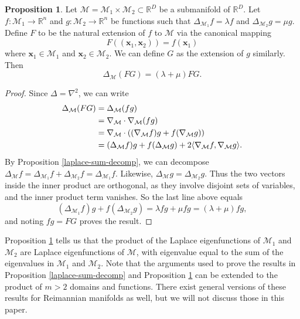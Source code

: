 \documentclass{article}
\numberwithin{equation}{section}
\theoremstyle{definition}
\newtheorem{prop}[thm]{Proposition}
\begin{document}
\begin{prop}\label{laplace-pof}
Let $\mathcal{M} = \mathcal{M}_1 \times \mathcal{M}_2 \subset \mathbb{R}^D$ be a submanifold of $\mathbb{R}^D$. Let $f : \mathcal{M}_1 \rightarrow \mathbb{R}^n$ and $g : \mathcal{M}_2 \rightarrow \mathbb{R}^n$ be functions such that $\Delta_{\mathcal{M}_1}f = \lambda f$ and $\Delta_{\mathcal{M}_2}g = \mu g$. Define $F$ to be the natural extension of $f$ to $\mathcal{M}$ via the canonical mapping
\[
F((\mathbf{x}_1, \mathbf{x}_2)) = f(\mathbf{x}_1)
\]
where $\mathbf{x}_1 \in \mathcal{M}_1$ and $\mathbf{x}_2 \in \mathcal{M}_2$. We can define $G$ as the extension of $g$ similarly. Then
\begin{equation}
    \Delta_\mathcal{M}(FG) = (\lambda + \mu)FG.
\end{equation}
\end{prop}
\begin{proof}
Since $\Delta = \nabla^2$, we can write
\begin{align}
    \notag \Delta_{\mathcal{M}}(FG) &= \Delta_{\mathcal{M}}(fg) \\
    \notag &= \nabla_{\mathcal{M}} \cdot \nabla_{\mathcal{M}}(fg) \\
    \notag &= \nabla_{\mathcal{M}}\cdot((\nabla_{\mathcal{M}} f)g + f(\nabla_{\mathcal{M}} g)) \\
    \notag &= (\Delta_{\mathcal{M}} f)g + f (\Delta_{\mathcal{M}} g) + 2\langle \nabla_{\mathcal{M}} f, \nabla_{\mathcal{M}} g\rangle.
\end{align}
By Proposition \ref{laplace-sum-decomp}, we can decompose $\Delta_\mathcal{M} f = \Delta_{\mathcal{M}_1}f + \Delta_{\mathcal{M}_2}f = \Delta_{\mathcal{M}_1}f$. Likewise, $\Delta_\mathcal{M} g = \Delta_{\mathcal{M}_2}g$. Thus the two vectors inside the inner product are orthogonal, as they involve disjoint sets of variables, and the inner product term vanishes. So the last line above equals
\[
(\Delta_{\mathcal{M}_1}f)g + f(\Delta_{\mathcal{M}_2}g) = \lambda fg + \mu fg = (\lambda+\mu)fg,
\]
and noting $fg = FG$ proves the result.
\end{proof}

Proposition \ref{laplace-pof} tells us that the product of the Laplace eigenfunctions of $\mathcal{M}_1$ and $\mathcal{M}_2$ are Laplace eigenfunctions of $\mathcal{M}$, with eigenvalue equal to the sum of the eigenvalues in $\mathcal{M}_1$ and $\mathcal{M}_2$. Note that the arguments used to prove the results in Proposition \ref{laplace-sum-decomp} and Proposition \ref{laplace-pof} can be extended to the product of $m > 2$ domains and functions. There exist general versions of these results for Reimannian manifolds as well, but we will not discuss those in this paper.
\end{document}
